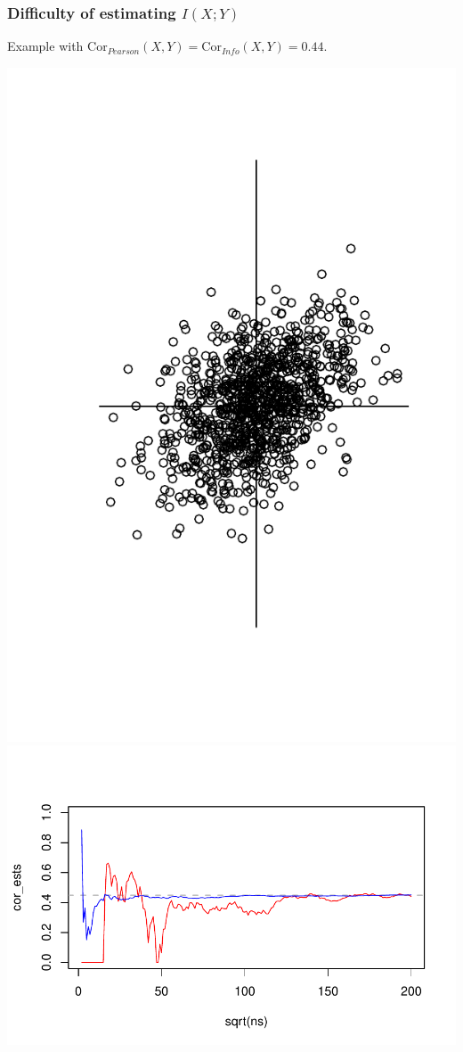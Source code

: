 \documentclass{beamer}
\begin{document}
\begin{frame}
\frametitle{Difficulty of estimating $I(X; Y)$}
Example with $\text{Cor}_{Pearson}(X, Y) = \text{Cor}_{Info}(X, Y) = 0.44$.
\begin{center}
\includegraphics[scale = 0.2, clip=true, trim=0 -2in 0 0]{../info_theory_sims/cor_2.pdf}
\includegraphics[scale = 0.5]{../info_theory_sims/cor_info2.pdf}
\end{center}
\end{frame}
\end{document}
